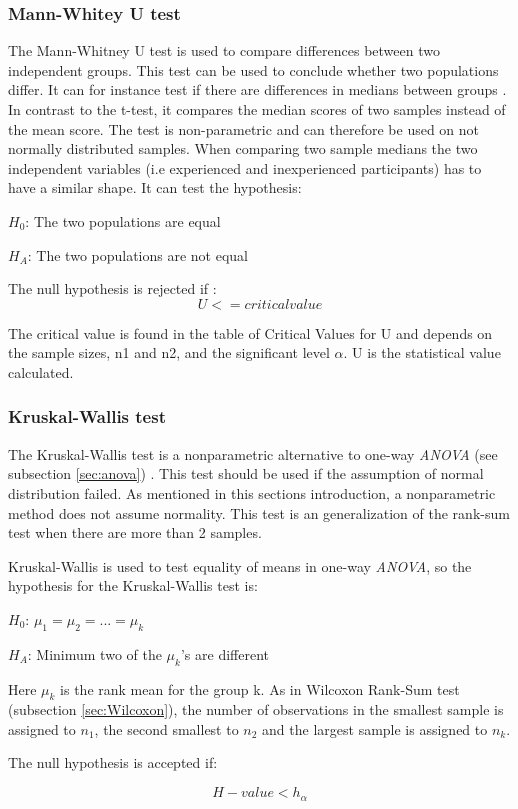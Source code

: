 \subsubsection{Mann-Whitey U test}
The Mann-Whitney U test is used to compare differences between two independent groups. This test can be used to conclude whether two populations differ. It can for instance test if there are differences in medians between groups \citep{LundResearchLtd2013b}. In contrast to the t-test, it compares the median scores of two samples instead of the mean score. The test is non-parametric and can therefore be used on not normally distributed samples. When comparing two sample medians the two independent variables (i.e experienced and inexperienced participants) has to have a similar shape. It can test the hypothesis: \\

\centerline{$H_{0}$: The two populations are equal} 
\centerline{$H_{A}$: The two populations are not equal}

The null hypothesis is rejected if \citep{LaMorte2017}: \\

\begin{equation}
\label{eq:mannwhitey-ciritcalvalue}
U <= critical value
\end{equation}

The critical value is found in the table of Critical Values for U and depends on the sample sizes, n1 and n2, and the significant level $\alpha$. U is the statistical value calculated. 

\subsubsection[Kruskal]{Kruskal-Wallis test}\label{sec:kruskal-w-test}
The Kruskal-Wallis test is a nonparametric alternative to one-way \textit{ANOVA} (see subsection \ref{sec:anova})  \citep{Walpole2012}. This test should be used if the assumption of normal distribution failed. As mentioned in this sections introduction, a nonparametric method does not assume normality. This test is an generalization of the rank-sum test when there are more than 2 samples.

Kruskal-Wallis is used to test equality of means in one-way \textit{ANOVA}, so the hypothesis for the Kruskal-Wallis test is:\newline

\centerline{$H_{0}$:  $\mu_{1} =  \mu_{2} = ... = \mu_{k} $} 
\centerline{$H_{A}$: Minimum two of the $\mu_{k}$'s are different}

Here $\mu_{k}$ is the rank mean for the group k. As in Wilcoxon Rank-Sum test (subsection \ref{sec:Wilcoxon}), the number of observations in the smallest sample is assigned to $n_1$, the second smallest to $n_2$ and the largest sample is assigned to $n_k$. 

The null hypothesis is accepted if: 

\begin{equation}
\label{eq:kruskapw-accept}
H-value < h_{\alpha}
\end{equation}